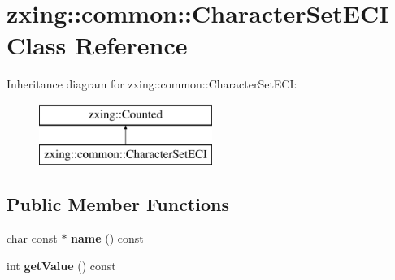 \hypertarget{classzxing_1_1common_1_1_character_set_e_c_i}{}\section{zxing\+:\+:common\+:\+:Character\+Set\+E\+CI Class Reference}
\label{classzxing_1_1common_1_1_character_set_e_c_i}
Inheritance diagram for zxing\+:\+:common\+:\+:Character\+Set\+E\+CI\+:\begin{figure}[H]
\begin{center}
\leavevmode
\includegraphics[height=2.000000cm]{classzxing_1_1common_1_1_character_set_e_c_i}
\end{center}
\end{figure}
\subsection*{Public Member Functions}
\begin{DoxyCompactItemize}
\item 
\mbox{\label{classzxing_1_1common_1_1_character_set_e_c_i_a577c9e93f52d2b00cd3fad3f1e5e2125}} 
char const  $\ast$ {\bfseries name} () const
\item 
\mbox{\label{classzxing_1_1common_1_1_character_set_e_c_i_a330d521b54dedf96bc915fd380997266}} 
int {\bfseries get\+Value} () const
\end{DoxyCompactItemize}
